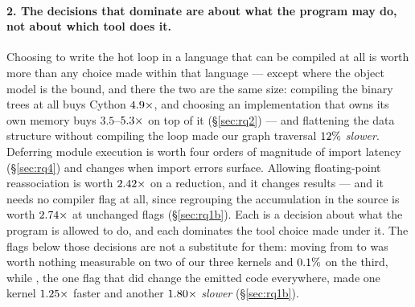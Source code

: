 \paragraph{2. The decisions that dominate are about what the program may do, not about which
tool does it.} Choosing
to write the hot loop in a language that can be compiled at all is worth more than any choice
made within that language --- except where the object model is the bound, and there the two are
the same size: compiling the binary trees at all buys Cython $\meas{ratio:b2_branchy-314:binarytrees/cpython_loop|b2_branchy-314:binarytrees/cython}{4.9}\times$, and choosing an
implementation that owns its own memory buys $3.5$--$\meas{ratio:b2_branchy-314:binarytrees/numba|b2_branchy-314:binarytrees/rust_ctypes}{5.3}\times$ on top of it
(\S\ref{sec:rq2}) --- and flattening
the data structure without compiling the loop made our graph traversal $\meas{pct:b2_branchy-314:bfs/cpython_flat|b2_branchy-314:bfs/cpython_loop}{12}\%$ \emph{slower}.
Deferring module execution is worth four orders of magnitude of import
latency (\S\ref{sec:rq4}) and changes when import errors surface. Allowing floating-point
reassociation is worth $\meas{ratio:b1_flags-314:arraysum/O3native|b1_flags-314:arraysum/O3native_ffast}{2.42}\times$ on a reduction, and it changes results --- and it needs no
compiler flag at all, since regrouping the accumulation in the source is worth $\meas{ratio:b1_flags-314:arraysum/accum_acc1|b1_flags-314:arraysum/accum_acc4}{2.74}\times$ at
unchanged flags (\S\ref{sec:rq1b}). Each is a decision about
what the program is allowed to do, and each dominates the tool choice made under it. The flags
below those decisions are not a substitute for them: moving from  to  was
worth nothing measurable on two of our three kernels and $\meas{pct:b1_flags-314:matmul/O2|b1_flags-314:matmul/O3}{0.1}\%$ on the third, while
, the one flag that did change the emitted code everywhere, made one kernel
$\meas{ratio:b1_flags-314:mandelbrot/O2|b1_flags-314:mandelbrot/O3native}{1.25}\times$ faster and another $\meas{ratio:b1_flags-314:matmul/O3native|b1_flags-314:matmul/O2}{1.80}\times$ \emph{slower} (\S\ref{sec:rq1b}).

